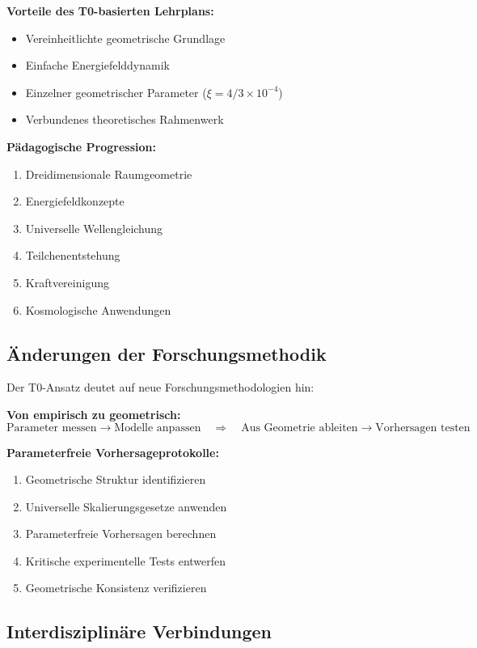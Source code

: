 \documentclass[12pt,a4paper]{report}
\begin{document}
	\textbf{Vorteile des T0-basierten Lehrplans:}
	\begin{itemize}
		\item Vereinheitlichte geometrische Grundlage
		\item Einfache Energiefelddynamik
		\item Einzelner geometrischer Parameter ($\xi = 4/3 \times 10^{-4}$)
		\item Verbundenes theoretisches Rahmenwerk
	\end{itemize}
	
	\textbf{Pädagogische Progression:}
	\begin{enumerate}
		\item Dreidimensionale Raumgeometrie
		\item Energiefeldkonzepte
		\item Universelle Wellengleichung
		\item Teilchenentstehung
		\item Kraftvereinigung
		\item Kosmologische Anwendungen
	\end{enumerate}
	
	\subsection{Änderungen der Forschungsmethodik}
	\label{subsec:research_methodology}
	
	Der T0-Ansatz deutet auf neue Forschungsmethodologien hin:
	
	\textbf{Von empirisch zu geometrisch:}
	\begin{equation}
		\text{Parameter messen} \rightarrow \text{Modelle anpassen} \quad \Rightarrow \quad \text{Aus Geometrie ableiten} \rightarrow \text{Vorhersagen testen}
	\end{equation}
	
	\textbf{Parameterfreie Vorhersageprotokolle:}
	\begin{enumerate}
		\item Geometrische Struktur identifizieren
		\item Universelle Skalierungsgesetze anwenden
		\item Parameterfreie Vorhersagen berechnen
		\item Kritische experimentelle Tests entwerfen
		\item Geometrische Konsistenz verifizieren
	\end{enumerate}
	
	\subsection{Interdisziplinäre Verbindungen}
	\label{subsec:interdisciplinary_connections}
	
\end{document}
